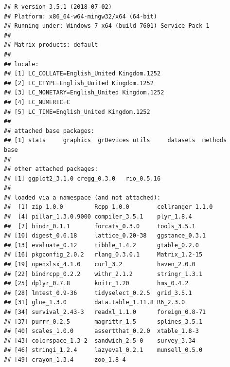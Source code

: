\documentclass[a4paper,12pt]{article}\usepackage[]{graphicx}\usepackage[]{color}
\makeatletter
\newenvironment{kframe}{%
 \def\at@end@of@kframe{}%
 \ifinner\ifhmode%
  \def\at@end@of@kframe{\end{minipage}}%
  \begin{minipage}{\columnwidth}%
 \fi\fi%
 \def\FrameCommand##1{\hskip\@totalleftmargin \hskip-\fboxsep
 \colorbox{shadecolor}{##1}\hskip-\fboxsep
     \hskip-\linewidth \hskip-\@totalleftmargin \hskip\columnwidth}%
 \MakeFramed {\advance\hsize-\width
   \@totalleftmargin\z@ \linewidth\hsize
   \@setminipage}}%
 {\par\unskip\endMakeFramed%
 \at@end@of@kframe}
\newenvironment{knitrout}{}{} %
\makeatother
\begin{document}
\begin{knitrout}
\color{fgcolor}\begin{kframe}
\begin{verbatim}
## R version 3.5.1 (2018-07-02)
## Platform: x86_64-w64-mingw32/x64 (64-bit)
## Running under: Windows 7 x64 (build 7601) Service Pack 1
## 
## Matrix products: default
## 
## locale:
## [1] LC_COLLATE=English_United Kingdom.1252 
## [2] LC_CTYPE=English_United Kingdom.1252   
## [3] LC_MONETARY=English_United Kingdom.1252
## [4] LC_NUMERIC=C                           
## [5] LC_TIME=English_United Kingdom.1252    
## 
## attached base packages:
## [1] stats     graphics  grDevices utils     datasets  methods   base     
## 
## other attached packages:
## [1] ggplot2_3.1.0 cregg_0.3.0   rio_0.5.16   
## 
## loaded via a namespace (and not attached):
##  [1] zip_1.0.0         Rcpp_1.0.0        cellranger_1.1.0 
##  [4] pillar_1.3.0.9000 compiler_3.5.1    plyr_1.8.4       
##  [7] bindr_0.1.1       forcats_0.3.0     tools_3.5.1      
## [10] digest_0.6.18     lattice_0.20-38   ggstance_0.3.1   
## [13] evaluate_0.12     tibble_1.4.2      gtable_0.2.0     
## [16] pkgconfig_2.0.2   rlang_0.3.0.1     Matrix_1.2-15    
## [19] openxlsx_4.1.0    curl_3.2          haven_2.0.0      
## [22] bindrcpp_0.2.2    withr_2.1.2       stringr_1.3.1    
## [25] dplyr_0.7.8       knitr_1.20        hms_0.4.2        
## [28] lmtest_0.9-36     tidyselect_0.2.5  grid_3.5.1       
## [31] glue_1.3.0        data.table_1.11.8 R6_2.3.0         
## [34] survival_2.43-3   readxl_1.1.0      foreign_0.8-71   
## [37] purrr_0.2.5       magrittr_1.5      splines_3.5.1    
## [40] scales_1.0.0      assertthat_0.2.0  xtable_1.8-3     
## [43] colorspace_1.3-2  sandwich_2.5-0    survey_3.34      
## [46] stringi_1.2.4     lazyeval_0.2.1    munsell_0.5.0    
## [49] crayon_1.3.4      zoo_1.8-4
\end{verbatim}
\end{kframe}
\end{knitrout}
\end{document}
